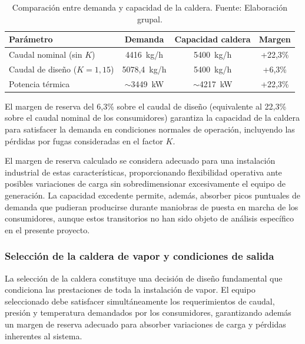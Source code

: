 \documentclass[12pt]{article}
\begin{document}
\begin{table}[H]
	\centering
	\caption{Comparación entre demanda y capacidad de la caldera. Fuente: Elaboración grupal.}
	\label{tab:margen-reserva-instalacion}
	\begin{tabular}{lccc}
		\toprule
		\textbf{Parámetro}              & \textbf{Demanda} & \textbf{Capacidad caldera} & \textbf{Margen} \\
		\midrule
		Caudal nominal (sin $K$)        & 4416~kg/h        & 5400~kg/h                  & +22,3\%         \\
		Caudal de diseño ($K = 1{,}15$) & 5078,4~kg/h      & 5400~kg/h                  & +6,3\%          \\
		Potencia térmica                & $\sim$3449~kW    & $\sim$4217~kW              & +22,3\%         \\
		\bottomrule
	\end{tabular}
\end{table}

El margen de reserva del 6,3\% sobre el caudal de diseño (equivalente al 22,3\% sobre el caudal nominal de los consumidores) garantiza la capacidad de la caldera para satisfacer la demanda en condiciones normales de operación, incluyendo las pérdidas por fugas consideradas en el factor $K$.

El margen de reserva calculado se considera adecuado para una instalación industrial de estas características, proporcionando flexibilidad operativa ante posibles variaciones de carga sin sobredimensionar excesivamente el equipo de generación. La capacidad excedente permite, además, absorber picos puntuales de demanda que pudieran producirse durante maniobras de puesta en marcha de los consumidores, aunque estos transitorios no han sido objeto de análisis específico en el presente proyecto.

\subsubsection{Selección de la caldera de vapor y condiciones de salida}
\label{subsubsec:seleccion-caldera-vitomax}

La selección de la caldera constituye una decisión de diseño fundamental que condiciona las prestaciones de toda la instalación de vapor. El equipo seleccionado debe satisfacer simultáneamente los requerimientos de caudal, presión y temperatura demandados por los consumidores, garantizando además un margen de reserva adecuado para absorber variaciones de carga y pérdidas inherentes al sistema.
\end{document}
